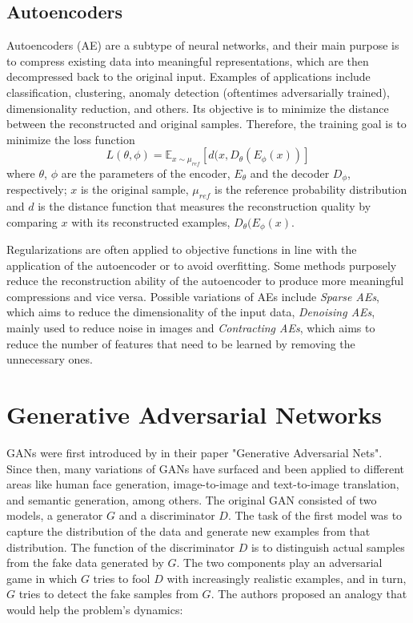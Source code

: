 \subsection{Autoencoders}
Autoencoders (AE) are a subtype of neural networks, and their main purpose is to compress existing data into meaningful representations, which are then decompressed back to the original input. Examples of applications include classification, clustering, anomaly detection (oftentimes adversarially trained), dimensionality reduction, and others. Its objective is to minimize the distance between the reconstructed and original samples. Therefore, the training goal is to minimize the loss function  
\begin{equation}
    L(\theta, \phi) = \mathbb{E}_{x\sim\mu_{ref}}[d(x, D_{\theta}(E_{\phi}(x))]
    \label{eq:ae_objective_func}
\end{equation} where $\theta$, $\phi$ are the parameters of the encoder, $E_\theta$ and the decoder $D_\phi$, respectively; $x$ is the original sample, $\mu_{ref}$ is the reference probability distribution and $d$ is the distance function that measures the reconstruction quality by comparing $x$ with its reconstructed examples, $D_{\theta}(E_{\phi}(x)$.

Regularizations are often applied to objective functions in line with the application of the autoencoder or to avoid overfitting. Some methods purposely reduce the reconstruction ability of the autoencoder to produce more meaningful compressions and vice versa. Possible variations of AEs include \textit{Sparse AEs}, which aims to reduce the dimensionality of the input data, \textit{Denoising AEs}, mainly used to reduce noise in images and \textit{Contracting AEs}, which aims to reduce the number of features that need to be learned by removing the unnecessary ones. %



\section{Generative Adversarial Networks}\label{sec:gan_background}
GANs were first introduced by \cite{goodfellow.etal_GenerativeAdversarialNets_} in their paper "Generative Adversarial Nets". Since then, many variations of GANs have surfaced and been applied to different areas like human face generation, image-to-image and text-to-image translation, and semantic generation, among others. The original GAN consisted of two models, a generator $G$ and a discriminator $D$. The task of the first model was to capture the distribution of the data and generate new examples from that distribution. The function of the discriminator $D$ is to distinguish actual samples from the fake data generated by $G$. The two components play an adversarial game in which $G$ tries to fool $D$ with increasingly realistic examples, and in turn, $G$ tries to detect the fake samples from $G$. The authors proposed an analogy that would help the problem's dynamics:


